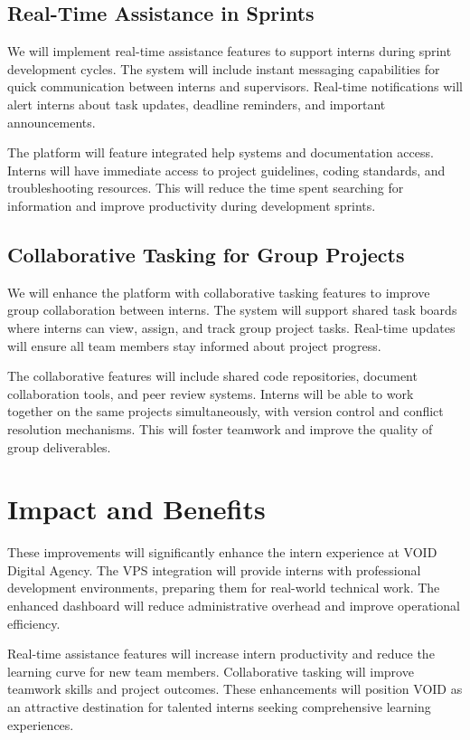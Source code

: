 \subsection{Real-Time Assistance in Sprints}

\noindent
We will implement real-time assistance features to support interns during sprint development cycles. The system will include instant messaging capabilities for quick communication between interns and supervisors. Real-time notifications will alert interns about task updates, deadline reminders, and important announcements.

The platform will feature integrated help systems and documentation access. Interns will have immediate access to project guidelines, coding standards, and troubleshooting resources. This will reduce the time spent searching for information and improve productivity during development sprints.

\subsection{Collaborative Tasking for Group Projects}

\noindent
We will enhance the platform with collaborative tasking features to improve group collaboration between interns. The system will support shared task boards where interns can view, assign, and track group project tasks. Real-time updates will ensure all team members stay informed about project progress.

The collaborative features will include shared code repositories, document collaboration tools, and peer review systems. Interns will be able to work together on the same projects simultaneously, with version control and conflict resolution mechanisms. This will foster teamwork and improve the quality of group deliverables.

\section{Impact and Benefits}

\noindent
These improvements will significantly enhance the intern experience at VOID Digital Agency. The VPS integration will provide interns with professional development environments, preparing them for real-world technical work. The enhanced dashboard will reduce administrative overhead and improve operational efficiency.

Real-time assistance features will increase intern productivity and reduce the learning curve for new team members. Collaborative tasking will improve teamwork skills and project outcomes. These enhancements will position VOID as an attractive destination for talented interns seeking comprehensive learning experiences.

